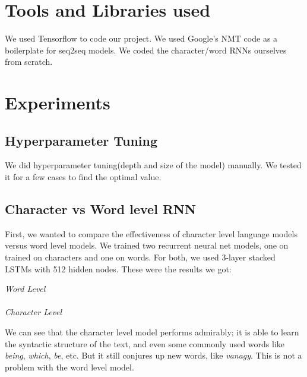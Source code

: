 \documentclass{article} %
\begin{document}
\section{Tools and Libraries used}
We used Tensorflow to code our project. We used Google's NMT code \cite{luong17} as a boilerplate for seq2seq models. We coded the character/word RNNs ourselves from scratch.

\section{Experiments}

\subsection*{Hyperparameter Tuning}
We did hyperparameter tuning(depth and size of the model) manually. We tested it for a few cases to find the optimal value.


\subsection*{Character vs Word level RNN} 
First, we wanted to compare the effectiveness of character level language models versus word level models. 
We trained two recurrent neural net models, one on trained on characters and one on words. For both, we used 3-layer stacked LSTMs with 512 hidden nodes. These were the results we got:

\emph{Word Level}\\
\\
\emph{Character Level}\\

We can see that the character level model performs admirably; it is able to learn the syntactic structure of the text, and even some commonly used words like \emph{being}, \emph{which}, \emph{be}, etc. But it still conjures up new words, like \emph{vanagy}. This is not a problem with the word level model. 
\end{document}
